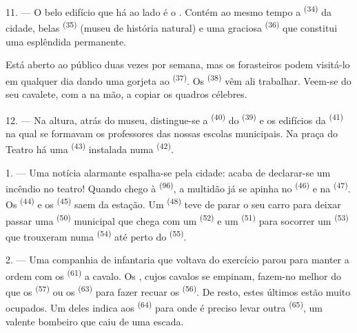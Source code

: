 \VUsaut{4.0mm}
\VUsaut{3.4mm}

11. --- O belo edifício que há ao lado é o . Contém ao mesmo
tempo a  \textsuperscript{(34)} da cidade, belas  \textsuperscript{(35)} (museu de história natural) e uma
graciosa  \textsuperscript{(36)} que constitui uma
esplêndida  permanente.

Está aberto ao público duas vezes por semana, mas os forasteiros podem
visitá-lo em qualquer dia dando uma gorjeta ao 
\textsuperscript{(37)}. Os  \textsuperscript{(38)} vêm ali trabalhar.
Veem-se  do seu cavalete, com a  na mão, a
copiar os quadros célebres.

12. --- Na altura, atrás do museu, distingue-se a 
\textsuperscript{(40)} do  \textsuperscript{(39)} e os edifícios da
 \textsuperscript{(41)} na qual se formavam os professores
das nossas escolas municipais. Na praça do Teatro há uma  \textsuperscript{(43)} instalada numa 
\textsuperscript{(42)}.

\VUsaut{5.0mm}
\VUsaut{3.0mm}

\VUsaut{3.4mm}

1. --- Uma notícia alarmante espalha-se pela cidade: acaba de declarar-se
um incêndio no teatro! Quando chego à  \textsuperscript{(96)}, a
multidão já se apinha no  \textsuperscript{(46)} e na
 \textsuperscript{(47)}. Os 
\textsuperscript{(44)} e os  \textsuperscript{(45)} saem da estação. Um
 \textsuperscript{(48)} teve de parar o seu carro para
deixar passar uma  \textsuperscript{(50)} municipal que chega com
um  \textsuperscript{(52)} e um 
\textsuperscript{(51)} para socorrer um  \textsuperscript{(53)} que
trouxeram numa  \textsuperscript{(54)} até perto do  \textsuperscript{(55)}.

2. --- Uma companhia de infantaria que voltava do exercício parou para
manter a ordem com os  \textsuperscript{(61)} a cavalo.
Os , cujos cavalos se empinam, fazem-no melhor do que
os  \textsuperscript{(57)} ou os 
\textsuperscript{(63)} para fazer recuar os  \textsuperscript{(56)}. De
resto, estes últimos estão muito ocupados. Um deles indica aos
 \textsuperscript{(64)} para onde é preciso levar outra
 \textsuperscript{(65)}, um valente bombeiro que caiu de uma escada.

